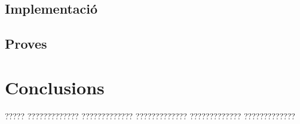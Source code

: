 \documentclass[11pt,catalan,listoffigures,listoftables]{tfgetsinf}
\begin{document}
\section{Implementació}

\section{Proves}


\chapter{Conclusions}

????? ????????????? ????????????? ????????????? ????????????? ????????????? 

\end{document}
